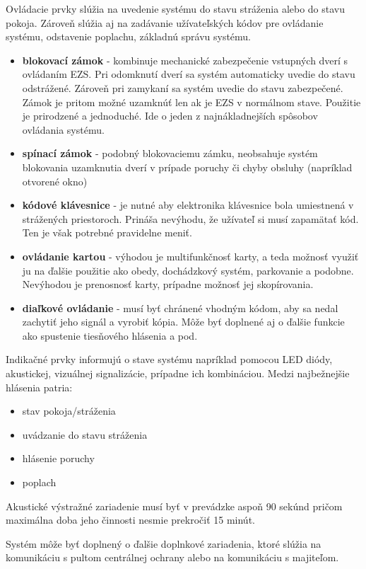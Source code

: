 Ovládacie prvky slúžia na uvedenie systému do stavu stráženia alebo do stavu pokoja. Zároveň slúžia aj na zadávanie užívateľských kódov pre ovládanie systému, odstavenie poplachu, základnú správu systému.
\begin{itemize}
    \item \textbf{blokovací zámok} - kombinuje mechanické zabezpečenie vstupných dverí s ovládaním EZS. Pri odomknutí dverí sa systém automaticky uvedie do stavu odstrážené. Zároveň pri zamykaní sa systém uvedie do stavu zabezpečené. Zámok je pritom možné uzamknúť len ak je EZS v normálnom stave. Použitie je prirodzené a jednoduché. Ide o jeden z najnákladnejších spôsobov ovládania systému.
    \item \textbf{spínací zámok} - podobný blokovaciemu zámku, neobsahuje systém blokovania uzamknutia dverí v prípade poruchy či chyby obsluhy (napríklad otvorené okno)
    \item \textbf{kódové klávesnice} - je nutné aby elektronika klávesnice bola umiestnená v strážených priestoroch. Prináša nevýhodu, že užívateľ si musí zapamätať kód. Ten je však potrebné pravidelne meniť.
    \item \textbf{ovládanie kartou} - výhodou je multifunkčnosť karty, a teda možnosť využiť ju na ďalšie použitie ako obedy, dochádzkový systém, parkovanie a podobne. Nevýhodou je prenosnosť karty, prípadne možnosť jej skopírovania.
    \item \textbf{diaľkové ovládanie} - musí byť chránené vhodným kódom, aby sa nedal zachytiť jeho signál a vyrobiť kópia. Môže byť doplnené aj o ďalšie funkcie ako spustenie tiesňového hlásenia a pod.\cite{velas_ezs}
\end{itemize}

Indikačné prvky informujú o stave systému napríklad pomocou LED diódy, akustickej, vizuálnej signalizácie, prípadne ich kombináciou. Medzi najbežnejšie hlásenia patria:
\begin{itemize}
    \item stav pokoja/stráženia
    \item uvádzanie do stavu stráženia
    \item hlásenie poruchy
    \item poplach
\end{itemize}

Akustické výstražné zariadenie musí byť v prevádzke aspoň 90 sekúnd pričom maximálna doba jeho činnosti nesmie prekročiť 15 minút.\cite{csn-en-50131-1}

Systém môže byť doplnený o ďalšie doplnkové zariadenia, ktoré slúžia na komunikáciu s pultom centrálnej ochrany alebo na komunikáciu s majiteľom.\cite{Krecek}

